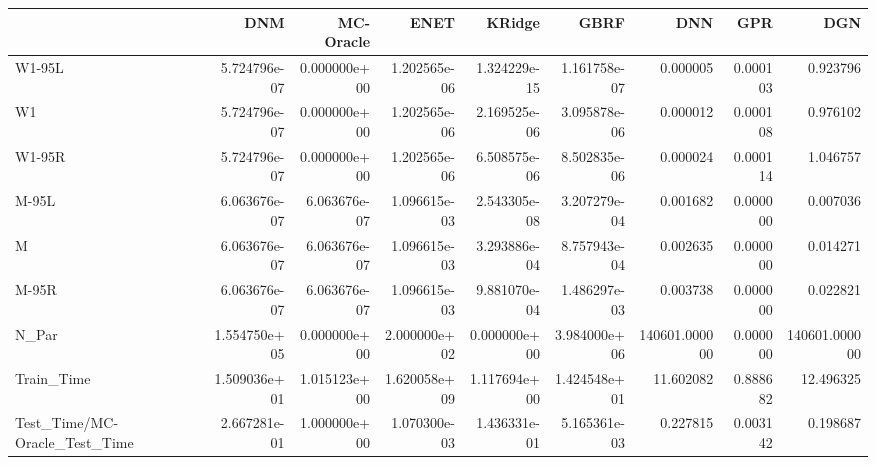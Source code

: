 \begin{tabular}{lrrrrrrrr}
\toprule
{} &           DNM &     MC-Oracle &          ENET &        KRidge &          GBRF &            DNN &       GPR &            DGN \\
\midrule
W1-95L                        &  5.724796e-07 &  0.000000e+00 &  1.202565e-06 &  1.324229e-15 &  1.161758e-07 &       0.000005 &  0.000103 &       0.923796 \\
W1                            &  5.724796e-07 &  0.000000e+00 &  1.202565e-06 &  2.169525e-06 &  3.095878e-06 &       0.000012 &  0.000108 &       0.976102 \\
W1-95R                        &  5.724796e-07 &  0.000000e+00 &  1.202565e-06 &  6.508575e-06 &  8.502835e-06 &       0.000024 &  0.000114 &       1.046757 \\
M-95L                         &  6.063676e-07 &  6.063676e-07 &  1.096615e-03 &  2.543305e-08 &  3.207279e-04 &       0.001682 &  0.000000 &       0.007036 \\
M                             &  6.063676e-07 &  6.063676e-07 &  1.096615e-03 &  3.293886e-04 &  8.757943e-04 &       0.002635 &  0.000000 &       0.014271 \\
M-95R                         &  6.063676e-07 &  6.063676e-07 &  1.096615e-03 &  9.881070e-04 &  1.486297e-03 &       0.003738 &  0.000000 &       0.022821 \\
N\_Par                         &  1.554750e+05 &  0.000000e+00 &  2.000000e+02 &  0.000000e+00 &  3.984000e+06 &  140601.000000 &  0.000000 &  140601.000000 \\
Train\_Time                    &  1.509036e+01 &  1.015123e+00 &  1.620058e+09 &  1.117694e+00 &  1.424548e+01 &      11.602082 &  0.888682 &      12.496325 \\
Test\_Time/MC-Oracle\_Test\_Time &  2.667281e-01 &  1.000000e+00 &  1.070300e-03 &  1.436331e-01 &  5.165361e-03 &       0.227815 &  0.003142 &       0.198687 \\
\bottomrule
\end{tabular}
